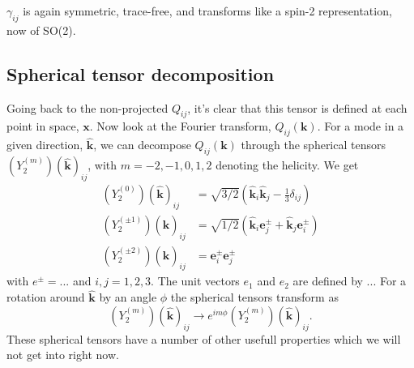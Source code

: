 \documentclass[11pt]{book}
\begin{document}
$\gamma_{ij}$ is again symmetric, trace-free, and transforms like a spin-2 representation, now of SO(2).

\subsection{Spherical tensor decomposition}
Going back to the non-projected $Q_{ij}$, it's clear that this tensor is defined at each point in space, $\mathbf x$. Now look at the Fourier transform, $Q_{ij}(\mathbf k)$. For a mode in a given direction, $\hat{\mathbf k}$, we can decompose $Q_{ij}(\mathbf k)$ through the spherical tensors $(Y_2^{(m)})(\hat{\mathbf k})_{ij}$, with $m=-2, -1, 0, 1, 2$ denoting the helicity. %
We get
\begin{align}
    (Y_2^{(0)})(\hat{\mathbf k})_{ij} &= \sqrt{3/2}(\hat{\mathbf k}_i\hat{\mathbf k}_j - \frac{1}{3}\delta_{ij})\\
    (Y_2^{(\pm 1)})(\hat{\mathbf k})_{ij} &= \sqrt{1/2}(\hat{\mathbf k}_i\mathbf e_j^\pm + \hat{\mathbf k}_j\mathbf e_i^\pm)\\
    (Y_2^{(\pm 2)})(\hat{\mathbf k})_{ij} &= \mathbf e_i^\pm \mathbf e_j^\pm
\end{align}
with $e^{\pm}=...$%
and $i,j=1,2,3$. The unit vectors $e_1$ and $e_2$ are defined by $...$ %
For a rotation around $\hat{\mathbf k}$ by an angle $\phi$ the spherical tensors transform as
$$
(Y_2^{(m)})(\hat{\mathbf k})_{ij} \rightarrow e^{im\phi}(Y_2^{(m)})(\hat{\mathbf k})_{ij}.
$$
These spherical tensors have a number of other usefull properties which we will not get into right now. 
\end{document}
